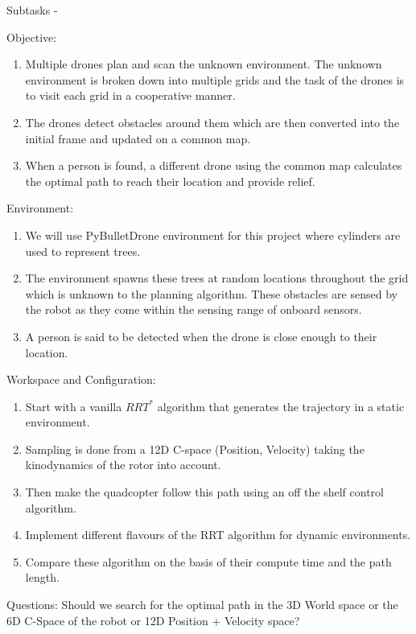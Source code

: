 Subtasks -



Objective:
\begin{enumerate}
    \item Multiple drones plan and scan the unknown environment. The unknown environment is broken down into multiple grids and the task of the drones is to visit each grid in a cooperative manner.
    \item The drones detect obstacles around them which are then converted into the initial frame and updated on a common map.
    \item When a person is found, a different drone using the common map calculates the optimal path to reach their location and provide relief.
\end{enumerate}
Environment:
\begin{enumerate}
    \item We will use PyBulletDrone environment for this project where cylinders are used to represent trees.
    \item The environment spawns these trees at random locations throughout the grid which is unknown to the planning algorithm. These obstacles are sensed by the robot as they come within the sensing range of onboard sensors.
    \item A person is said to be detected when the drone is close enough to their location.
\end{enumerate}
Workspace and Configuration:
\begin{enumerate}
    \item Start with a vanilla \(RRT^*\) algorithm that generates the trajectory in a static environment.
    \item Sampling is done from a 12D C-space (Position, Velocity) taking the kinodynamics of the rotor into account.
    \item Then make the quadcopter follow this path using an off the shelf control algorithm.
    \item Implement different flavours of the RRT algorithm for dynamic environments. 
    \item Compare these algorithm on the basis of their compute time and the path length.
\end{enumerate}

Questions: Should we search for the optimal path in the 3D World space or the 6D C-Space of the robot or 12D Position + Velocity space?
